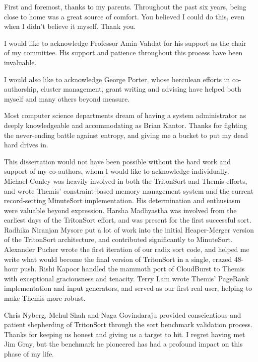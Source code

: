 \begin{acknowledgements}

First and foremost, thanks to my parents. Throughout the past six years, being
close to home was a great source of comfort. You believed I could do this, even
when I didn't believe it myself. Thank you.

I would like to acknowledge Professor Amin Vahdat for his support as the chair
of my committee.  His support and patience throughout this process have been
invaluable.

I would also like to acknowledge George Porter, whose herculean efforts in
co-authorship, cluster management, grant writing and advising have helped
both myself and many others beyond measure.

Most computer science departments dream of having a system administrator as
deeply knowledgeable and accommodating as Brian Kantor. Thanks for fighting the
never-ending battle against entropy, and giving me a bucket to put my dead hard
drives in.

This dissertation would not have been possible without the hard work and
support of my co-authors, whom I would like to acknowledge
individually. Michael Conley was heavily involved in both the TritonSort and
Themis efforts, and wrote Themis' constraint-based memory management system and
the current record-setting MinuteSort implementation. His determination and
enthusiasm were valuable beyond expression.  Harsha Madhyastha was involved
from the earliest days of the TritonSort effort, and was present for the first
successful sort. Radhika Niranjan Mysore put a lot of work into the initial
Heaper-Merger version of the TritonSort architecture, and contributed
significantly to MinuteSort. Alexander Pucher wrote the first iteration of our
radix sort code, and helped me write what would become the final version of
TritonSort in a single, crazed 48-hour push. Rishi Kapoor handled the mammoth
port of CloudBurst to Themis with exceptional graciousness and tenacity. Terry
Lam wrote Themis' PageRank implementation and input generators, and served as
our first real user, helping to make Themis more robust.

Chris Nyberg, Mehul Shah and Naga Govindaraju provided conscientious and
patient shepherding of TritonSort through the sort benchmark validation
process. Thanks for keeping us honest and giving us a target to hit.  I regret
having met Jim Gray, but the benchmark he pioneered has had a profound impact
on this phase of my life.


\end{acknowledgements}
